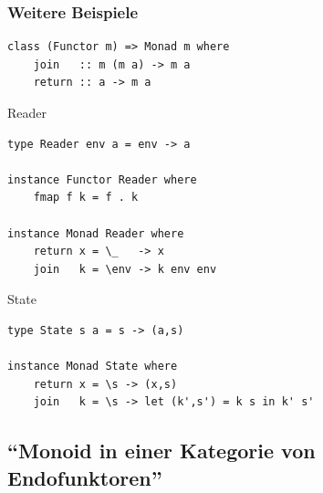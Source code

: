 \documentclass[12pt,compress,ngerman,utf8,t]{beamer}
\begin{document}

\begin{frame}[fragile]\frametitle{Weitere Beispiele}
  \vspace*{-1em}
  \begin{verbatim}
class (Functor m) => Monad m where
    join   :: m (m a) -> m a
    return :: a -> m a
  \end{verbatim}

  \begin{block}{Reader}
    \scriptsize
    \begin{verbatim}
type Reader env a = env -> a

instance Functor Reader where
    fmap f k = f . k

instance Monad Reader where
    return x = \_   -> x
    join   k = \env -> k env env
    \end{verbatim}
  \end{block}

  \begin{block}{State}
    \scriptsize
    \begin{verbatim}
type State s a = s -> (a,s)

instance Monad State where
    return x = \s -> (x,s)
    join   k = \s -> let (k',s') = k s in k' s'
    \end{verbatim}
  \end{block}
\end{frame}



\subsection{"`Monoid in einer Kategorie von Endofunktoren"'}
\end{document}
